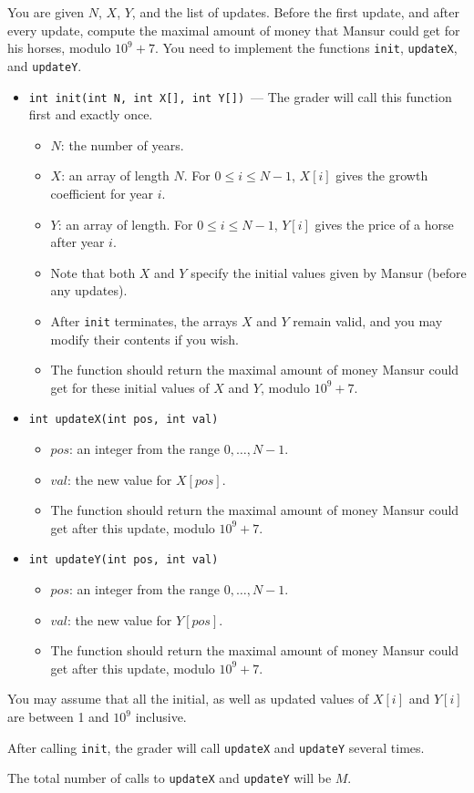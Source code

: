 You are given $N$, $X$, $Y$, and the list of updates. Before the first update, and after every update, compute the maximal amount of money that Mansur could get for his horses, modulo $10^9 + 7$. You need to implement the functions \texttt{init}, \texttt{updateX}, and \texttt{updateY}.
\begin{itemize}
\item \texttt{int init(int N, int X[], int Y[])}~--- The grader will call this function first and exactly once.
\begin{itemize}
\item $N$: the number of years.
\item $X$: an array of length $N$. For $0 \le i\le N - 1$, $X[i]$ gives the growth coefficient for year $i$.
\item $Y$: an array of length. For $0 \le i \le N - 1$, $Y[i]$ gives the price of a horse after year $i$.
\item Note that both $X$ and $Y$ specify the initial values given by Mansur (before any updates).
\item After \texttt{init} terminates, the arrays $X$ and $Y$ remain valid, and you may modify their contents if you wish.
\item The function should return the maximal amount of money Mansur could get for these initial values of $X$ and $Y$, modulo $10^9 + 7$.
\end{itemize}

\item \texttt{int updateX(int pos, int val)}
\begin{itemize}
\item $pos$: an integer from the range $0, \ldots, N - 1$.
\item $val$: the new value for $X[pos]$.
\item The function should return the maximal amount of money Mansur could get after this update, modulo $10^9 + 7$.
\end{itemize}

\item \texttt{int updateY(int pos, int val)}
\begin{itemize}
\item $pos$: an integer from the range $0, \ldots, N - 1$.
\item $val$: the new value for $Y[pos]$.
\item The function should return the maximal amount of money Mansur could get after this update, modulo $10^9 + 7$.
\end{itemize}
\end{itemize}

You may assume that all the initial, as well as updated values of $X[i]$ and $Y[i]$ are between 1 and $10^9$ inclusive.

After calling \texttt{init}, the grader will call \texttt{updateX} and \texttt{updateY} several times. 

The total number of
calls to \texttt{updateX} and \texttt{updateY} will be $M$.